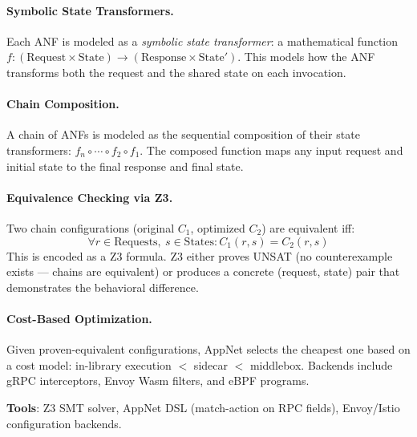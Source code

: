 \paragraph{Symbolic State Transformers.}
Each ANF is modeled as a \emph{symbolic state transformer}: a mathematical function $f: (\text{Request} \times \text{State}) \to (\text{Response} \times \text{State}')$. This models how the ANF transforms both the request and the shared state on each invocation.

\paragraph{Chain Composition.}
A chain of ANFs is modeled as the sequential composition of their state transformers: $f_n \circ \cdots \circ f_2 \circ f_1$. The composed function maps any input request and initial state to the final response and final state.

\paragraph{Equivalence Checking via Z3.}
Two chain configurations (original $C_1$, optimized $C_2$) are equivalent iff:
\[ \forall r \in \text{Requests},\ s \in \text{States}: C_1(r, s) = C_2(r, s) \]
This is encoded as a Z3 formula. Z3 either proves UNSAT (no counterexample exists --- chains are equivalent) or produces a concrete (request, state) pair that demonstrates the behavioral difference.

\paragraph{Cost-Based Optimization.}
Given proven-equivalent configurations, AppNet selects the cheapest one based on a cost model: in-library execution $<$ sidecar $<$ middlebox. Backends include gRPC interceptors, Envoy Wasm filters, and eBPF programs.

\textbf{Tools}: Z3 SMT solver, AppNet DSL (match-action on RPC fields), Envoy/Istio configuration backends.

